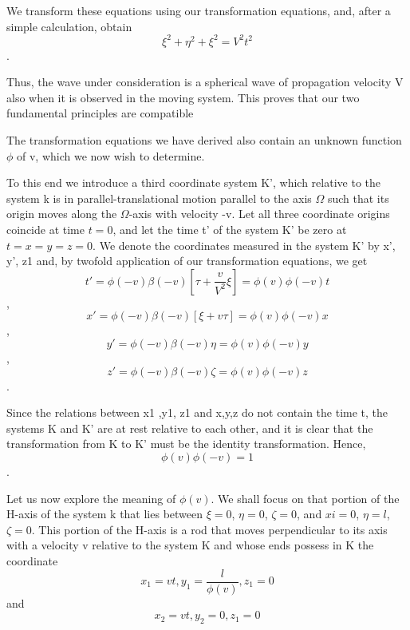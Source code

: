 ﻿\documentclass{article} %
\begin{document}
We transform these equations using our transformation equations, and, after a simple calculation, obtain 
\begin{equation} \xi^2+\eta^2+\xi^2 = V^2t^2 \nonumber\end{equation}.

Thus, the wave under consideration is a spherical wave of propagation velocity V also when it is observed in the moving system. 
This proves that our two fundamental principles are compatible
	
The transformation equations we have derived also contain an unknown function $\phi$ of v, which we now wish to determine. 

To this end we introduce a third coordinate system K', which relative to the system k is in parallel-translational motion parallel to the axis $\Omega$ such that its origin moves along the $\Omega$-axis with velocity -v. 
Let all three coordinate origins coincide at time $t=0$, and let the time t' of the system K' be zero at $t=x=y=z=0$. 
We denote the coordinates measured in the system K' by x', y', z1 and, by twofold application of our transformation equations, we get
\begin{equation} t'=\phi(-v)\beta(-v)\left[\tau+\frac{v}{V^2}\xi\right]=\phi(v)\phi(-v)t\nonumber\end{equation},
\begin{equation} x'=\phi(-v)\beta(-v)\left[\xi+v\tau\right]=\phi(v)\phi(-v)x\nonumber\end{equation},
\begin{equation} y'=\phi(-v)\beta(-v)\eta=\phi(v)\phi(-v)y\nonumber\end{equation},
\begin{equation} z'=\phi(-v)\beta(-v)\zeta=\phi(v)\phi(-v)z\nonumber\end{equation}.

Since the relations between x1 ,y1, z1 and x,y,z do not contain the time t, the systems K and K' are at rest relative to each other, and it is clear that the transformation from K to K' must be the identity transformation. 
Hence,
\begin{equation} \phi(v)\phi(-v)=1\nonumber\end{equation}. 

Let us now explore the meaning of $\phi(v)$. 
We shall focus on that portion of the H-axis of the system k that lies between $\xi=0$, $\eta=0$, $\zeta=0$, and $xi=0$, $\eta=l$, $\zeta=0$. 
This portion of the H-axis is a rod that moves perpendicular to its axis with a velocity v relative to the system K and whose ends possess in K the coordinate
\begin{equation} x_1=vt,y_1=\frac{l}{\phi(v)},z_1=0\nonumber\end{equation}
and
\begin{equation} x_2=vt,y_2=0,z_1=0\nonumber\end{equation}
\end{document}
